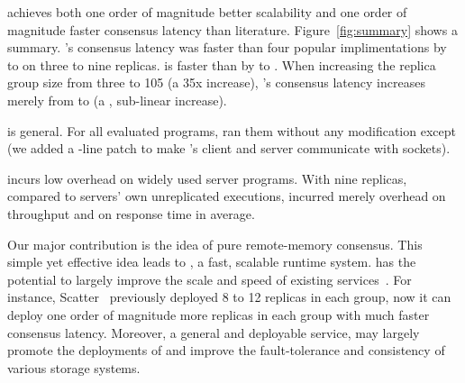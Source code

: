 \begin{tightenum}
\item \xxx achieves both one order of magnitude better scalability and one 
order of magnitude faster consensus latency than literature. 
Figure~\ref{fig:summary} shows a summary. \xxx's consensus latency was faster 
than four popular \paxos implimentations by \comptradlow to \comptradhigh on 
three to nine replicas. \xxx is faster than \dare by \fasterDARElow to 
\fasterDARE. When increasing the replica group size from three to 105 (a 35x 
increase), \xxx's consensus latency increases merely from \xxxlatencythree to 
\xxxlatencyonezerofive (a \xxxscalability, sub-linear increase).

\item \xxx is general. For all \nprog evaluated programs, \xxx ran them without 
any modification except \calvin (we added a \nlinescalvin-line patch to make 
\calvin's client and server communicate with sockets).

\item \xxx incurs low overhead on \nprog widely used server programs. 
With nine replicas, compared to servers' own unreplicated executions, \xxx 
incurred merely \tputoverhead overhead on throughput and \latencyoverhead on 
response time in average.








\end{tightenum}  

Our major contribution is the idea of pure remote-memory consensus. This simple 
yet effective idea leads to \xxx, a fast, scalable \paxos runtime system. \xxx 
has the potential to largely improve the scale and speed of existing \paxos 
services~\cite{scatter:sosp11,manos:hotdep10,crane:sosp15,rex:eurosys14}. For 
instance, Scatter~\cite{scatter:sosp11} previously deployed 8 to 12 replicas in 
each \paxos group, now it can deploy one order of magnitude more replicas in 
each group with much faster consensus latency. Moreover, a general and 
deployable service, \xxx may largely promote the deployments of \paxos and 
improve the fault-tolerance and consistency of various storage systems.

